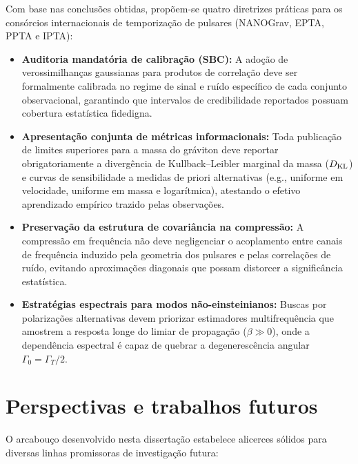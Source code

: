 Com base nas conclusões obtidas, propõem-se quatro diretrizes práticas para os consórcios internacionais de temporização de pulsares (NANOGrav, EPTA, PPTA e IPTA):
\begin{itemize}
  \item \textbf{Auditoria mandatória de calibração (SBC):} A adoção de verossimilhanças gaussianas para produtos de correlação deve ser formalmente calibrada no regime de sinal e ruído específico de cada conjunto observacional, garantindo que intervalos de credibilidade reportados possuam cobertura estatística fidedigna.
  \item \textbf{Apresentação conjunta de métricas informacionais:} Toda publicação de limites superiores para a massa do gráviton deve reportar obrigatoriamente a divergência de Kullback--Leibler marginal da massa ($D_{\rm KL}$) e curvas de sensibilidade a medidas de priori alternativas (e.g., uniforme em velocidade, uniforme em massa e logarítmica), atestando o efetivo aprendizado empírico trazido pelas observações.
  \item \textbf{Preservação da estrutura de covariância na compressão:} A compressão em frequência não deve negligenciar o acoplamento entre canais de frequência induzido pela geometria dos pulsares e pelas correlações de ruído, evitando aproximações diagonais que possam distorcer a significância estatística.
  \item \textbf{Estratégias espectrais para modos não-einsteinianos:} Buscas por polarizações alternativas devem priorizar estimadores multifrequência que amostrem a resposta longe do limiar de propagação ($\beta \gg 0$), onde a dependência espectral é capaz de quebrar a degenerescência angular $\Gamma_0 = \Gamma_T/2$.
\end{itemize}

\section{Perspectivas e trabalhos futuros}

O arcabouço desenvolvido nesta dissertação estabelece alicerces sólidos para diversas linhas promissoras de investigação futura:

